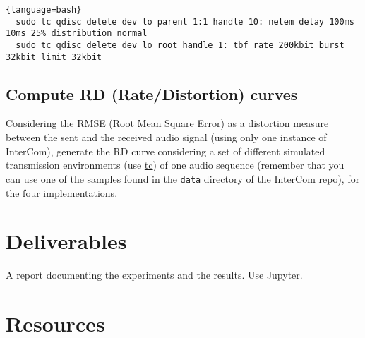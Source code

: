 \begin{lstlisting}{language=bash}
  sudo tc qdisc delete dev lo parent 1:1 handle 10: netem delay 100ms 10ms 25% distribution normal
  sudo tc qdisc delete dev lo root handle 1: tbf rate 200kbit burst 32kbit limit 32kbit
\end{lstlisting}

\subsection{Compute RD (Rate/Distortion) curves}
Considering the
\href{https://en.wikipedia.org/wiki/Root-mean-square_deviation}{RMSE
  (Root Mean Square Error)} as a distortion measure between the sent and
the received audio signal (using only one instance of InterCom),
generate the RD curve considering a set of different simulated
transmission environments (use
\href{https://man7.org/linux/man-pages/man8/tc.8.html}{tc}) of one
audio sequence (remember that you can use one of the samples found in
the \verb|data| directory of the InterCom repo), for the four
implementations.


\section{Deliverables}

A report documenting the experiments and the results. Use Jupyter.

\section{Resources}


